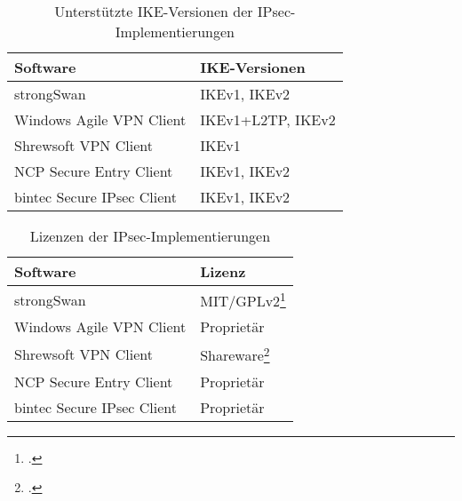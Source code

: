 \begin{center}
\begin{table}[h]
\begin{tabularx}{250pt}{|X|X|}\firsthline
Software & IKE-Versionen \\ \hline
strongSwan & IKEv1, IKEv2\\ \hline
Windows Agile VPN Client & IKEv1+L2TP, IKEv2 \\ \hline
Shrewsoft VPN Client & IKEv1 \\ \hline
NCP Secure Entry Client & IKEv1, IKEv2 \\ \hline
bintec Secure IPsec Client & IKEv1, IKEv2 \\ \hline
\end{tabularx}
\label{tab:IPsec-Implementierungen-IKE-Versionen}
\caption{Unterstützte IKE-Versionen der IPsec-Implementierungen}
\end{table}


\begin{table}[h]
\begin{tabularx}{250pt}{|X|X|}\firsthline
Software & Lizenz \\ \hline
strongSwan & MIT/GPLv2\footcite[][]{_contributions_2014} \\ \hline
Windows Agile VPN Client & Proprietär \\ \hline
Shrewsoft VPN Client & Shareware\footcite[][]{_shrew_2007} \\ \hline
NCP Secure Entry Client & Proprietär \\ \hline
bintec Secure IPsec Client & Proprietär \\ \hline
\end{tabularx}
\label{tab:IPsec-Implementierungen-Lizenzen}
\caption{Lizenzen der IPsec-Implementierungen}
\end{table}


\end{center}
